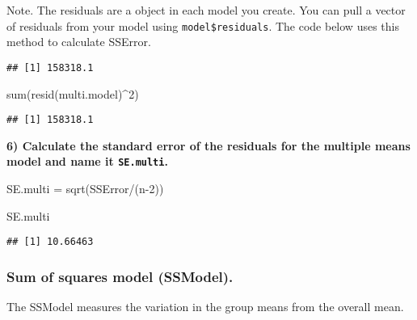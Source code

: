 \documentclass[
]{article}
\newenvironment{Shaded}{\begin{snugshade}}{\end{snugshade}}
\newcommand{\DecValTok}[1]{\textcolor[rgb]{0.00,0.00,0.81}{#1}}
\newcommand{\FunctionTok}[1]{\textcolor[rgb]{0.00,0.00,0.00}{#1}}
\newcommand{\NormalTok}[1]{#1}
\newcommand{\OtherTok}[1]{\textcolor[rgb]{0.56,0.35,0.01}{#1}}
\newcommand{\SpecialCharTok}[1]{\textcolor[rgb]{0.00,0.00,0.00}{#1}}
\begin{document}
Note. The residuals are a object in each model you create. You can pull
a vector of residuals from your model using \texttt{model\$residuals}.
The code below uses this method to calculate SSError.

\begin{Shaded}
\end{Shaded}

\begin{verbatim}
## [1] 158318.1
\end{verbatim}

\begin{Shaded}
\begin{Highlighting}[]
\FunctionTok{sum}\NormalTok{(}\FunctionTok{resid}\NormalTok{(multi.model)}\SpecialCharTok{\^{}}\DecValTok{2}\NormalTok{)}
\end{Highlighting}
\end{Shaded}

\begin{verbatim}
## [1] 158318.1
\end{verbatim}

\textbf{6) Calculate the standard error of the residuals for the
multiple means model and name it \texttt{SE.multi}.}

\begin{Shaded}
\begin{Highlighting}[]
\NormalTok{SE.multi }\OtherTok{=} \FunctionTok{sqrt}\NormalTok{(SSError}\SpecialCharTok{/}\NormalTok{(n}\DecValTok{{-}2}\NormalTok{))}

\NormalTok{SE.multi}
\end{Highlighting}
\end{Shaded}

\begin{verbatim}
## [1] 10.66463
\end{verbatim}

\hypertarget{sum-of-squares-model-ssmodel.}{%
\subsubsection{Sum of squares model
(SSModel).}\label{sum-of-squares-model-ssmodel.}}

The SSModel measures the variation in the group means from the overall
mean.
\end{document}
